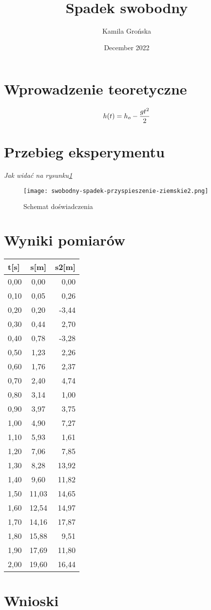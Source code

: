 \documentclass{article}
\title{Spadek swobodny}
\author{Kamila Grońska}
\date{December 2022}
\begin{document}
\maketitle
\section{Wprowadzenie teoretyczne}
\begin{center}
\begin{equation}
 h(t) = h_o-{gt^2\over 2}   
\end{equation}
\end{center}

\section{Przebieg eksperymentu }
\textit{Jak widać na rysunku\ref{fig:Schemat doświadczenia}}


\begin{figure}[h]
\begin{center}
    
\texttt{[image: swobodny-spadek-przyspieszenie-ziemskie2.png]}
\caption{Schemat doświadczenia}
\label{fig:Schemat doświadczenia}
\end{center}
\end{figure}

\section{Wyniki pomiarów}
\begin{tabular}{l|c|r}
\toprule
t[s]  &	s[m]	&	s2[m]\\
\midrule
0,00  &	0,00	&	0,00\\
0,10 &	0,05	&	0,26\\
0,20 &	0,20	&	-3,44\\
0,30 &	0,44	&	2,70\\
0,40 &	0,78	&	-3,28\\
0,50 &	1,23	&	2,26\\
0,60 &	1,76	&	2,37\\
0,70 &	2,40	&	4,74\\
0,80 &	3,14	&	1,00\\
0,90 &	3,97	&	3,75\\
1,00 &	4,90	&	7,27\\
1,10 &	5,93	&	1,61\\
1,20 &	7,06	&	7,85\\
1,30 &	8,28	&	13,92\\
1,40 &	9,60	&	11,82\\
1,50 &	11,03	&	14,65\\
1,60 &	12,54	&	14,97\\
1,70 &	14,16	&	17,87\\
1,80 & 	15,88	&	9,51\\
1,90 &  17,69	&	11,80\\
2,00 &	19,60	&	16,44\\
\bottomrule
\end{tabular}

\section{Wnioski}
\end{document}
